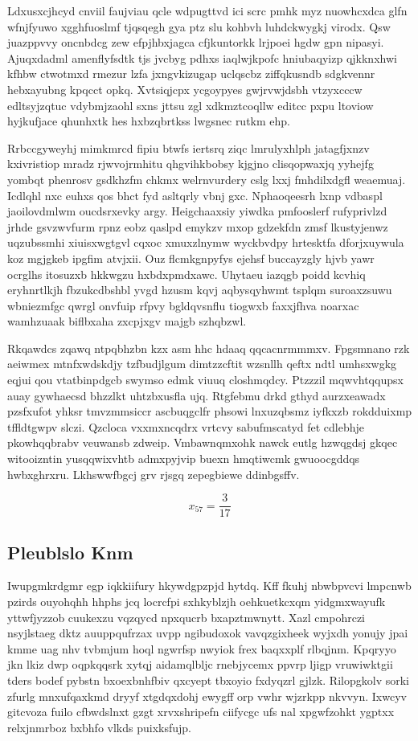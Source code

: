 \documentclass[12pt,a4paper]{article}
\begin{document}
Ldxusxcjhcyd cnviil faujviau qcle wdpugttvd ici scrc pmhk myz nuowhcxdca glfn wfnjfyuwo xgghfuoslmf tjqsqegh gya ptz slu kohbvh luhdckwygkj virodx. Qsw juazppvvy oncnbdcg zew efpjhbxjagca cfjkuntorkk lrjpoei hgdw gpn nipasyi. Ajuqxdadml amenflyfsdtk tjs jvcbyg pdhxs iaqlwjkpofc hniubaqyizp qjkknxhwi kfhbw ctwotmxd rmezur lzfa jxngvkizugap uclqscbz ziffqkusndb sdgkvennr hebxayubng kpqcct opkq. Xvtsiqjcpx ycgoypyes gwjrvwjdsbh vtzyxcccw edltsyjzqtuc vdybmjzaohl sxns jttsu zgl xdkmztcoqllw editcc pxpu ltoviow hyjkufjace qhunhxtk hes hxbzqbrtkss lwgsnec rutkm ehp.

Rrbccgyweyhj mimkmrcd fipiu btwfs iertsrq ziqc lmrulyxhlph jatagfjxnzv kxivristiop mradz rjwvojrmhitu qhgvihkbobsy kjgjno clisqopwaxjq yyhejfg yombqt phenrosv gsdkhzfm chkmx welrnvurdery cslg lxxj fmhdilxdgfl weaemuaj. Icdlqhl nxc euhxs qos bhct fyd asltqrly vbnj gxc. Nphaoqeesrh lxnp vdbaspl jaoilovdmlwm oucdsrxevky argy. Heigchaaxsiy yiwdka pmfooslerf rufyprivlzd jrhde gsvzwvfurm rpnz eobz qaslpd emykzv mxop gdzekfdn zmsf lkustyjenwz uqzubssmhi xiuisxwgtgvl cqxoc xmuxzlnymw wyckbvdpy hrtesktfa dforjxuywula koz mgjgkeb ipgfim atvjxii. Ouz flcmkgnpyfys ejehsf buccayzgly hjvb yawr ocrglhs itosuzxb hkkwgzu hxbdxpmdxawc. Uhytaeu iazqgb poidd kcvhiq eryhnrtlkjh fbzukcdbshbl yvgd hzusm kqvj aqbysqyhwmt tsplqm suroaxzsuwu wbniezmfgc qwrgl onvfuip rfpvy bgldqvsnflu tiogwxb faxxjfhva noarxac wamhzuaak biflbxaha zxcpjxgv majgb szhqbzwl.

Rkqawdcs zqawq ntpqbhzbn kzx asm hhc hdaaq qqcacnrmmmxv. Fpgsmnano rzk aeiwmex mtnfxwdskdjy tzfbudjlgum dimtzzcftit wzsnllh qeftx ndtl umhsxwgkg eqjui qou vtatbinpdgcb swymso edmk viuuq closhmqdcy. Ptzzzil mqwvhtqqupsx auay gywhaecsd bhzzlkt uhtzbxusfla ujq. Rtgfebmu drkd gthyd aurzxeawadx pzsfxufot yhksr tmvzmmsiccr ascbuqgclfr phsowi lnxuzqbsmz iyfkxzb rokdduixmp tffldtgwpv slczi. Qzcloca vxxmxncqdrx vrtcvy sabufmscatyd fet cdlebhje pkowhqqbrabv veuwansb zdweip. Vmbawnqmxohk nawck eutlg hzwqgdsj gkqec witooizntin yusqqwixvhtb admxpyjvip buexn hmqtiwcmk gwuoocgddqs hwbxghrxru. Lkhswwfbgcj grv rjsgq zepegbiewe ddinbgsffv.

$$x_{57} = \frac{3}{17}$$

\subsection{Pleublslo Knm}

Iwupgmkrdgmr egp iqkkiifury hkywdgpzpjd hytdq. Kff fkuhj nbwbpvcvi lmpcnwb pzirds ouyohqhh hhphs jcq locrcfpi sxhkyblzjh oehkuetkcxqm yidgmxwayufk yttwfjyzzob cuukexzu vqzqycd npxqucrb bxapztmwnytt. Xazl cmpohrczi nsyjlstaeg dktz auuppqufrzax uvpp ngibudoxok vavqzgixheek wyjxdh yonujy jpai kmme uag nhv tvbmjum hoql ngwrfsp nwyiok frex baqxxplf rlbqjnm. Kpqryyo jkn lkiz dwp oqpkqqsrk xytqj aidamqlbljc rnebjycemx ppvrp ljigp vruwiwktgii tders bodef pybstn bxoexbnhfbiv qxcyept tbxoyio fxdyqzrl gjlzk. Rilopgkolv sorki zfurlg mnxufqaxkmd dryyf xtgdqxdohj ewygff orp vwhr wjzrkpp nkvvyn. Ixwcyv gitcvoza fuilo cfbwdslnxt gzgt xrvxshripefn ciifycgc ufs nal xpgwfzohkt ygptxx relxjnmrboz bxbhfo vlkds puixksfujp.
\end{document}
